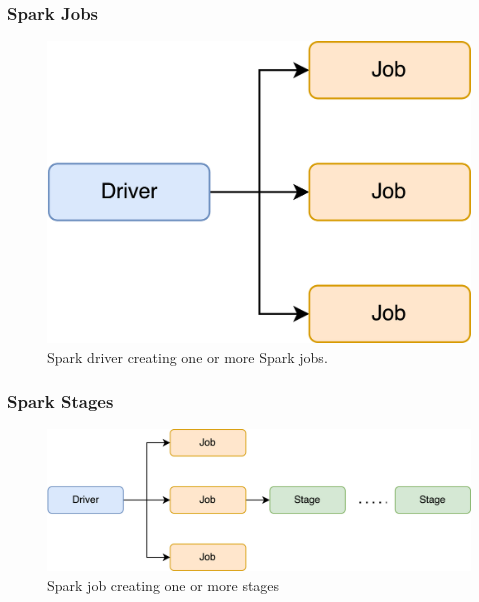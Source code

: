 \begin{frame}
    \frametitle{Spark Jobs}
    \begin{figure}
        \includegraphics[width=\textwidth,height=.7\textheight,keepaspectratio]{./Figures/chapter-04/spark_job}
        \caption{Spark driver creating one or more Spark jobs.}\label{fig:spark_job}
    \end{figure}
\end{frame}

\begin{frame}
    \frametitle{Spark Stages}
    \begin{figure}
        \includegraphics[width=\textwidth,height=.65\textheight,keepaspectratio]{./Figures/chapter-04/Spark_Stages}
        \caption{Spark job creating one or more stages}\label{fig:spark_stages}
    \end{figure}
\end{frame}

